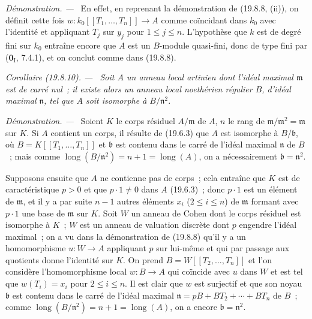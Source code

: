 \documentclass[10pt,oneside]{book}
\makeatletter
\newcommand{\setmanualcurrentlabel}[1]{\def\@currentlabel{#1}}
\newenvironment{corollary}[1][]{%
  \setmanualcurrentlabel{#1}\par\medskip\noindent\itshape Corollaire (#1). ---\ }{\par}
\newenvironment{proof}{%
  \par\medskip\noindent\textit{Démonstration. ---\ }}{\par}
\makeatother
\begin{document}
\begin{proof}
En effet, en reprenant la démonstration de (19.8.8, (ii)), on définit cette fois
$w:k_0[[T_1,\ldots,T_n]]\to A$ comme coïncidant dans $k_0$ avec l'identité et
appliquant $T_j$ sur $y_j$ pour $1\leq j\leq n$. L'hypothèse que $k$ est de
degré fini sur $k_0$ entraîne encore que $A$ est un $B$-module quasi-fini, donc
de type fini par ($\mathbf 0_{\mathrm I}$, 7.4.1), et on conclut comme dans
(19.8.8).
\end{proof}

\begin{corollary}[19.8.10]
\label{0.19.8.10-fr}
Soit $A$ un anneau local artinien dont l'idéal maximal $\mathfrak m$ est de
carré nul~; il existe alors un anneau local noethérien régulier $B$, d'idéal
maximal $\mathfrak n$, tel que $A$ soit isomorphe à $B/\mathfrak n^2$.
\end{corollary}

\begin{proof}
Soient $K$ le corps résiduel $A/\mathfrak m$ de $A$, $n$ le rang de
$\mathfrak m/\mathfrak m^2=\mathfrak m$ sur $K$. Si $A$ contient un corps, il
résulte de (19.6.3) que $A$ est isomorphe à $B/\mathfrak b$, où
$B=K[[T_1,\ldots,T_n]]$ et $\mathfrak b$ est contenu dans le carré de l'idéal
maximal $\mathfrak n$ de $B$~; mais comme
$\operatorname{long}(B/\mathfrak n^2)=n+1=\operatorname{long}(A)$, on a
nécessairement $\mathfrak b=\mathfrak n^2$.

Supposons ensuite que $A$ ne contienne pas de corps~; cela entraîne que $K$ est
de caractéristique $p>0$ et que $p\cdot1\neq0$ dans $A$ (19.6.3)~; donc
$p\cdot1$ est un élément de $\mathfrak m$, et il y a par suite $n-1$ autres
éléments $x_i$ ($2\leq i\leq n$) de $\mathfrak m$ formant avec $p\cdot1$ une
base de $\mathfrak m$ sur $K$. Soit $W$ un anneau de Cohen dont le corps
résiduel est isomorphe à $K$~; $W$ est un anneau de valuation discrète dont $p$
engendre l'idéal maximal~; on a vu dans la démonstration de (19.8.8) qu'il y a
un homomorphisme $u:W\to A$ appliquant $p$ sur lui-même et qui par passage aux
quotients donne l'identité sur $K$. On prend $B=W[[T_2,\ldots,T_n]]$ et l'on
considère l'homomorphisme local $w:B\to A$ qui coïncide avec $u$ dans $W$ et
est tel que $w(T_i)=x_i$ pour $2\leq i\leq n$. Il est clair que $w$ est
surjectif et que son noyau $\mathfrak b$ est contenu dans le carré de l'idéal
maximal $\mathfrak n=pB+BT_2+\cdots+BT_n$ de $B$~; comme
$\operatorname{long}(B/\mathfrak n^2)=n+1=\operatorname{long}(A)$, on a encore
$\mathfrak b=\mathfrak n^2$.
\end{proof}
\end{document}
